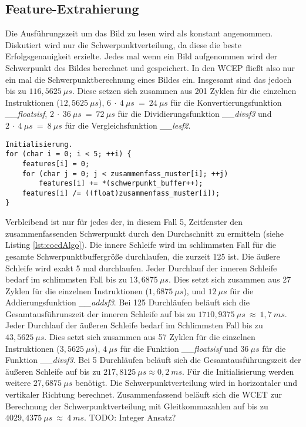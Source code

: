\subsection{Feature-Extrahierung}
Die Ausführungszeit um das Bild zu lesen wird als konstant angenommen. Diskutiert wird nur die Schwerpunktverteilung, da diese die beste Erfolgsgenauigkeit erzielte.
\newline
\newline
Jedes mal wenn ein Bild
aufgenommen wird der Schwerpunkt des Bildes berechnet und gespeichert. In den WCEP fließt also nur ein mal die Schwerpunktberechnung eines Bildes ein. Insgesamt sind das jedoch bis zu $116,5625\ \mu s$.
Diese setzen sich zusammen aus 201 Zyklen für die einzelnen Instruktionen ($12,5625\ \mu s$), $6\ \cdot\ 4\ \mu s\ =\ 24\ \mu s$ für die Konvertierungsfunktion
\textit{\_\_floatsisf}, $2\ \cdot\ 36\ \mu s\ =\ 72\ \mu s$ für die Dividierungsfunktion \textit{\_\_divsf3} und $2\ \cdot\ 4\ \mu s\ =\ 8\ \mu s$ für die Vergleichsfunktion \textit{\_\_lesf2}.
\begin{lstlisting}[label=lst:cocdAlgo,caption={Algorithmus um die Schwerpunktverteilung zu berechnen.}]
Initialisierung.
for (char i = 0; i < 5; ++i) {
    features[i] = 0;
    for (char j = 0; j < zusammenfass_muster[i]; ++j)
        features[i] += *(schwerpunkt_buffer++);
    features[i] /= ((float)zusammenfass_muster[i]);
}
\end{lstlisting}
Verbleibend ist nur für jedes der, in diesem Fall 5, Zeitfenster den zusammenfassenden Schwerpunkt durch den Durchschnitt zu ermitteln (siehe Listing \ref{lst:cocdAlgo}). Die innere Schleife wird im
schlimmsten Fall für die gesamte Schwerpunktbuffergröße durchlaufen, die zurzeit 125 ist. Die äußere Schleife wird exakt 5 mal durchlaufen.
\newline
\newline
Jeder Durchlauf der inneren Schleife bedarf im schlimmsten Fall bis zu $13,6875\ \mu s$. Dies setzt sich zusammen aus 27 Zyklen für die einzelnen Instruktionen ($1,6875\ \mu s$),
und $12\ \mu s$ für die Addierungsfunktion \textit{\_\_addsf3}. Bei 125 Durchläufen beläuft sich die Gesamtausführunszeit der inneren Schleife auf bis zu $1710,9375\ \mu s\ \approx\ 1,7\ ms$.
\newline
\newline
Jeder Durchlauf der äußeren Schleife bedarf im Schlimmsten Fall bis zu $43,5625\ \mu s$. Dies setzt sich zusammen aus 57 Zyklen für die einzelnen Instruktionen ($3,5625\ \mu s$),
$4\ \mu s$ für die Funktion \textit{\_\_floatsisf} und $36\ \mu s$ für die Funktion \textit{\_\_divsf3}. Bei 5 Durchläufen beläuft sich die Gesamtausführungszeit
der äußeren Schleife auf bis zu $217,8125\ \mu s \approx 0,2\ ms$.
\newline
\newline
Für die Initialisierung werden weitere $27,6875\ \mu s$ benötigt. Die Schwerpunktverteilung wird in horizontaler und vertikaler Richtung berechnet. Zusammenfassend beläuft sich die WCET zur Berechnung der
Schwerpunktverteilung mit Gleitkommazahlen auf bis zu $4029,4375\ \mu s\ \approx\ 4\ ms$.
\newline
\newline
TODO: Integer Ansatz?
